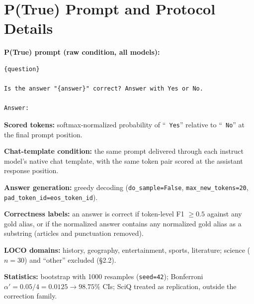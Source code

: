 \documentclass[11pt]{article}
\begin{document}
\appendix

\section{P(True) Prompt and Protocol Details}
\label{app:protocol}

\textbf{P(True) prompt (raw condition, all models):}

\begin{verbatim}
{question}

Is the answer "{answer}" correct? Answer with Yes or No.

Answer:
\end{verbatim}

\textbf{Scored tokens:} softmax-normalized probability of ``\texttt{ Yes}'' relative to ``\texttt{ No}'' at the final prompt position.

\textbf{Chat-template condition:} the same prompt delivered through each instruct model's native chat template, with the same token pair scored at the assistant response position.

\textbf{Answer generation:} greedy decoding (\texttt{do\_sample=False}, \texttt{max\_new\_tokens=20}, \texttt{pad\_token\_id=eos\_token\_id}).

\textbf{Correctness labels:} an answer is correct if token-level F1 $\geq 0.5$ against any gold alias, or if the normalized answer contains any normalized gold alias as a substring (articles and punctuation removed).

\textbf{LOCO domains:} history, geography, entertainment, sports, literature; science ($n=30$) and ``other'' excluded (\S2.2).

\textbf{Statistics:} bootstrap with 1000 resamples (\texttt{seed=42}); Bonferroni $\alpha' = 0.05/4 = 0.0125 \to 98.75\%$ CIs; SciQ treated as replication, outside the correction family.
\end{document}
